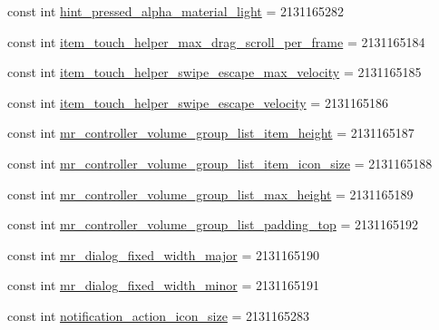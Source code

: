 \begin{DoxyCompactItemize}
\item 
const int \mbox{\hyperlink{class_f_w_p_s___app_1_1_droid_1_1_resource_1_1_dimension_a4bbdbfda40160639dfd1cab4af914d09}{hint\+\_\+pressed\+\_\+alpha\+\_\+material\+\_\+light}} = 2131165282
\item 
const int \mbox{\hyperlink{class_f_w_p_s___app_1_1_droid_1_1_resource_1_1_dimension_a76f12c69bc3597b4a4421ad713c43398}{item\+\_\+touch\+\_\+helper\+\_\+max\+\_\+drag\+\_\+scroll\+\_\+per\+\_\+frame}} = 2131165184
\item 
const int \mbox{\hyperlink{class_f_w_p_s___app_1_1_droid_1_1_resource_1_1_dimension_ad94c348394847ebbe51c1db1d1858af5}{item\+\_\+touch\+\_\+helper\+\_\+swipe\+\_\+escape\+\_\+max\+\_\+velocity}} = 2131165185
\item 
const int \mbox{\hyperlink{class_f_w_p_s___app_1_1_droid_1_1_resource_1_1_dimension_ad853dce0e0e0c2e7625e751e0a0fb869}{item\+\_\+touch\+\_\+helper\+\_\+swipe\+\_\+escape\+\_\+velocity}} = 2131165186
\item 
const int \mbox{\hyperlink{class_f_w_p_s___app_1_1_droid_1_1_resource_1_1_dimension_a3a7e8b55c5298123f0015c81f875b046}{mr\+\_\+controller\+\_\+volume\+\_\+group\+\_\+list\+\_\+item\+\_\+height}} = 2131165187
\item 
const int \mbox{\hyperlink{class_f_w_p_s___app_1_1_droid_1_1_resource_1_1_dimension_ac5f716fa2624e3f8802469a975eb344a}{mr\+\_\+controller\+\_\+volume\+\_\+group\+\_\+list\+\_\+item\+\_\+icon\+\_\+size}} = 2131165188
\item 
const int \mbox{\hyperlink{class_f_w_p_s___app_1_1_droid_1_1_resource_1_1_dimension_aa6a8f0034110160bc600da0e08105c8d}{mr\+\_\+controller\+\_\+volume\+\_\+group\+\_\+list\+\_\+max\+\_\+height}} = 2131165189
\item 
const int \mbox{\hyperlink{class_f_w_p_s___app_1_1_droid_1_1_resource_1_1_dimension_ad25f9a3a30c243edd10647bae28ab13d}{mr\+\_\+controller\+\_\+volume\+\_\+group\+\_\+list\+\_\+padding\+\_\+top}} = 2131165192
\item 
const int \mbox{\hyperlink{class_f_w_p_s___app_1_1_droid_1_1_resource_1_1_dimension_aaa1ce3ee163c21fab6295869d3b2b082}{mr\+\_\+dialog\+\_\+fixed\+\_\+width\+\_\+major}} = 2131165190
\item 
const int \mbox{\hyperlink{class_f_w_p_s___app_1_1_droid_1_1_resource_1_1_dimension_abf401fce3473ce9009fde6524dc19178}{mr\+\_\+dialog\+\_\+fixed\+\_\+width\+\_\+minor}} = 2131165191
\item 
const int \mbox{\hyperlink{class_f_w_p_s___app_1_1_droid_1_1_resource_1_1_dimension_a620264b876978db5c736616c237de56b}{notification\+\_\+action\+\_\+icon\+\_\+size}} = 2131165283

\end{DoxyCompactItemize}
